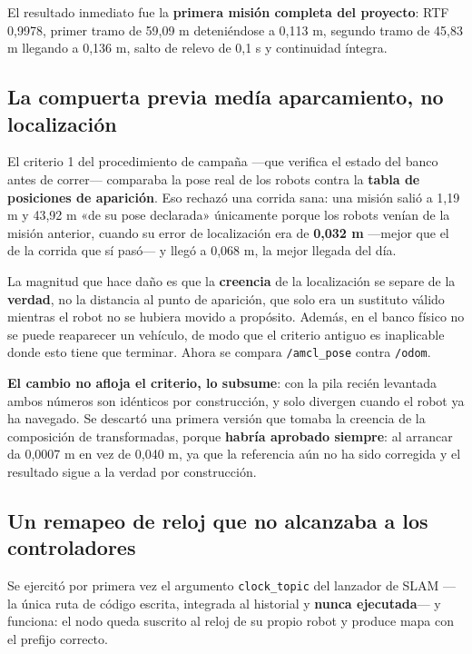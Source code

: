 \documentclass[12pt,letterpaper]{article}
\begin{document}
El resultado inmediato fue la \textbf{primera misión completa del proyecto}: RTF 0,9978, primer tramo de 59,09 m deteniéndose a 0,113 m, segundo tramo de 45,83 m llegando a 0,136 m, salto de relevo de 0,1 s y continuidad íntegra.

\subsection{La compuerta previa medía aparcamiento, no localización}

El criterio 1 del procedimiento de campaña ---que verifica el estado del banco antes de correr--- comparaba la pose real de los robots contra la \textbf{tabla de posiciones de aparición}. Eso rechazó una corrida sana: una misión salió a 1,19 m y 43,92 m «de su pose declarada» únicamente porque los robots venían de la misión anterior, cuando su error de localización era de \textbf{0,032 m} ---mejor que el de la corrida que sí pasó--- y llegó a 0,068 m, la mejor llegada del día.

La magnitud que hace daño es que la \textbf{creencia} de la localización se separe de la \textbf{verdad}, no la distancia al punto de aparición, que solo era un sustituto válido mientras el robot no se hubiera movido a propósito. Además, en el banco físico no se puede reaparecer un vehículo, de modo que el criterio antiguo es inaplicable donde esto tiene que terminar. Ahora se compara \texttt{/amcl\_pose} contra \texttt{/odom}.

\textbf{El cambio no afloja el criterio, lo subsume}: con la pila recién levantada ambos números son idénticos por construcción, y solo divergen cuando el robot ya ha navegado. Se descartó una primera versión que tomaba la creencia de la composición de transformadas, porque \textbf{habría aprobado siempre}: al arrancar da 0,0007 m en vez de 0,040 m, ya que la referencia aún no ha sido corregida y el resultado sigue a la verdad por construcción.

\subsection{Un remapeo de reloj que no alcanzaba a los controladores}

Se ejercitó por primera vez el argumento \texttt{clock\_topic} del lanzador de SLAM ---la única ruta de código escrita, integrada al historial y \textbf{nunca ejecutada}--- y funciona: el nodo queda suscrito al reloj de su propio robot y produce mapa con el prefijo correcto.
\end{document}
